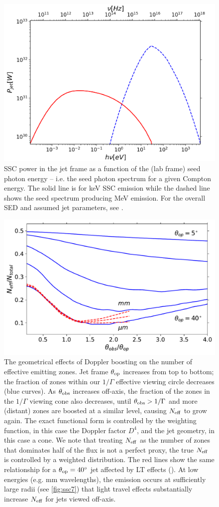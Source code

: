 \begin{figure}[t]
\includegraphics[width=0.65\linewidth]{figures/Figure8.pdf}
\centering
\caption{SSC power in the jet frame as a function of the (lab frame) seed photon energy -- i.e. the seed photon spectrum for a given Compton energy. The solid line is for keV SSC emission while the dashed line shows the seed spectrum producing MeV emission. For the overall SED and assumed jet parameters, see .}
\label{fig:ssc8}
\end{figure}

\begin{figure}[t]
 \includegraphics[width=0.65\linewidth]{figures/Figure9.pdf}
 \centering
 \caption{The geometrical effects of Doppler boosting on the number of effective emitting zones. Jet frame $\theta_{\rm op}$ increases from top to bottom; the fraction of zones within our $1/\Gamma$ effective viewing circle decreases (blue curves). As $\theta_{\rm obs}$ increases off-axis, the fraction of the zones in the $1/\Gamma$ viewing cone also decreases, until $\theta_{\rm obs} > 1/\Gamma$ and more (distant) zones are boosted at a similar level, causing $N_{\rm eff}$ to grow again. The exact functional form is controlled by the weighting function, in this case the Doppler factor $D^4$, and the jet geometry, in this case a cone. We note that treating $N_{\rm eff}$ as the number of zones that dominates half of the flux is not a perfect proxy, the true $N_{\rm eff}$ is controlled by a weighted distribution. The red lines show the same relationship for a $\theta_{\rm op} = 40^{\circ}$ jet affected by LT effects (). At low energies (e.g. mm wavelengths), the emission occurs at sufficiently large radii (see \cref{fig:ssc7}) that light travel effects substantially increase $N_{\rm eff}$ for jets viewed off-axis.
 }
 \label{fig:ssc9}
 \end{figure}

